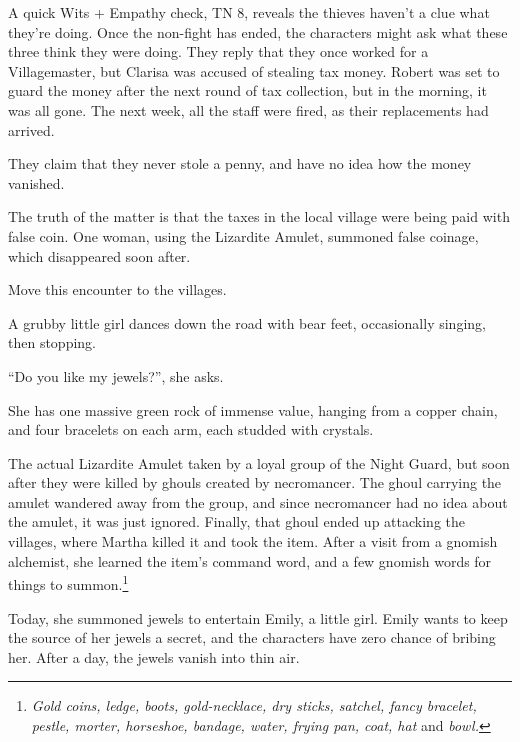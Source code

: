 \begin{multicols}{2}
A quick Wits + Empathy check, TN 8, reveals the thieves haven't a clue what they're doing.
Once the non-fight has ended, the characters might ask what these three think they were doing.
They reply that they once worked for a Villagemaster, but Clarisa was accused of stealing tax money.
Robert was set to guard the money after the next round of tax collection, but in the morning, it was all gone.
The next week, all the staff were fired, as their replacements had arrived.

They claim that they never stole a penny, and have no idea how the money vanished.

The truth of the matter is that the taxes in the local village were being paid with false coin.
One woman, using the Lizardite Amulet, summoned false coinage, which disappeared soon after.



Move this encounter to the villages.


\begin{boxtext}
	A grubby little girl dances down the road with bear feet, occasionally singing, then stopping.

		``Do you like my jewels?'', she asks.

	She has one massive green rock of immense value, hanging from a copper chain, and four bracelets on each arm, each studded with crystals.
\end{boxtext}

The actual Lizardite Amulet taken by a loyal group of the Night Guard, but soon after they were killed by ghouls created by \gls{necromancer}.
The ghoul carrying the amulet wandered away from the group, and since \gls{necromancer} had no idea about the amulet, it was just ignored.
Finally, that ghoul ended up attacking the villages, where Martha killed it and took the item.
After a visit from a gnomish alchemist, she learned the item's command word, and a few gnomish words for things to summon.\footnote
{\textit{Gold coins, ledge, boots, gold-necklace, dry sticks, satchel, fancy bracelet, pestle, morter, horseshoe, bandage, water, frying pan, coat, hat} and \textit{bowl.}}

Today, she summoned jewels to entertain Emily, a little girl.
Emily wants to keep the source of her jewels a secret, and the characters have zero chance of bribing her.
After a day, the jewels vanish into thin air.


\end{multicols}
